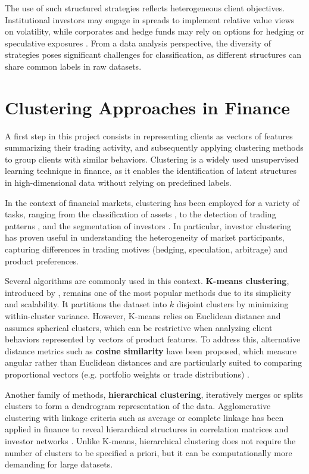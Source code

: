 \documentclass[12pt,a4paper]{report}
\begin{document}
The use of such structured strategies reflects heterogeneous client objectives. Institutional investors may engage in spreads to implement relative value views on volatility, while corporates and hedge funds may rely on options for hedging or speculative exposures \citep{bollen2004does}. From a data analysis perspective, the diversity of strategies poses significant challenges for classification, as different structures can share common labels in raw datasets.


\section{Clustering Approaches in Finance}

A first step in this project consists in representing clients as vectors of features summarizing their trading activity, and subsequently applying clustering methods to group clients with similar behaviors. Clustering is a widely used unsupervised learning technique in finance, as it enables the identification of latent structures in high-dimensional data without relying on predefined labels.

In the context of financial markets, clustering has been employed for a variety of tasks, ranging from the classification of assets \citep{mantegna1999hierarchical, bonanno2004networks}, to the detection of trading patterns \citep{marti2017clustering}, and the segmentation of investors \citep{barucca2016network, bettonvil2021investor}. In particular, investor clustering has proven useful in understanding the heterogeneity of market participants, capturing differences in trading motives (hedging, speculation, arbitrage) and product preferences.

Several algorithms are commonly used in this context. \textbf{K-means clustering}, introduced by \citet{macqueen1967some}, remains one of the most popular methods due to its simplicity and scalability. It partitions the dataset into \(k\) disjoint clusters by minimizing within-cluster variance. However, K-means relies on Euclidean distance and assumes spherical clusters, which can be restrictive when analyzing client behaviors represented by vectors of product features. To address this, alternative distance metrics such as \textbf{cosine similarity} have been proposed, which measure angular rather than Euclidean distances and are particularly suited to comparing proportional vectors (e.g. portfolio weights or trade distributions) \citep{steinhaus1957sur}. 

Another family of methods, \textbf{hierarchical clustering}, iteratively merges or splits clusters to form a dendrogram representation of the data. Agglomerative clustering with linkage criteria such as average or complete linkage has been applied in finance to reveal hierarchical structures in correlation matrices and investor networks \citep{tumminello2010correlation, marti2017clustering}. Unlike K-means, hierarchical clustering does not require the number of clusters to be specified a priori, but it can be computationally more demanding for large datasets.
\end{document}
